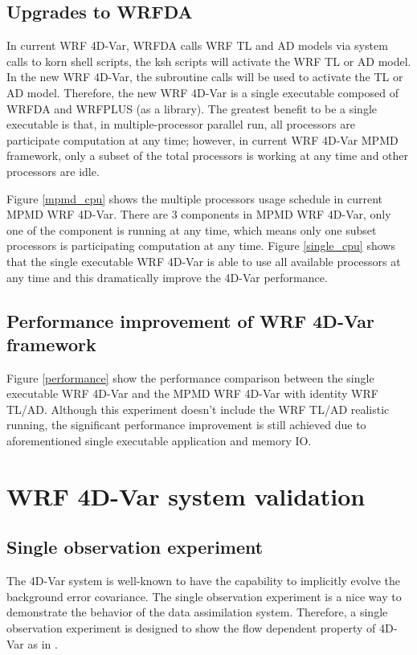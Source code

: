 \documentclass[12pt]{article}
\begin{document}
\subsection{Upgrades to WRFDA}

In current WRF 4D-Var, WRFDA calls WRF TL and AD models via system calls to korn shell scripts, the ksh scripts will activate the WRF TL or AD model. In the new WRF 4D-Var, the subroutine calls will be used to activate the TL or AD model. Therefore, the new WRF 4D-Var is a single executable composed of WRFDA and WRFPLUS (as a library). The greatest benefit to be a single executable is that, in multiple-processor parallel run, all processors are participate computation at any time; however, in current WRF 4D-Var MPMD framework, only a subset of the total processors is working at any time and other processors are idle.

Figure \ref{mpmd_cpu} shows the multiple processors usage schedule in current MPMD WRF 4D-Var. There are 3 components in MPMD WRF 4D-Var, only one of the component is running at any time, which means only one subset processors is participating computation at any time. Figure \ref{single_cpu} shows that the single executable WRF 4D-Var is able to use all available processors at any time and this dramatically improve the 4D-Var performance. 

\subsection{Performance improvement of WRF 4D-Var framework}

Figure \ref{performance} show the performance comparison between the single executable WRF 4D-Var and the MPMD WRF 4D-Var with identity WRF TL/AD.  Although this experiment doesn't include the WRF TL/AD realistic running, the significant performance improvement is still achieved due to aforementioned single executable application and memory IO.

\section{WRF 4D-Var system validation}

\subsection{Single observation experiment}

The 4D-Var system is well-known to have the capability to implicitly evolve the background error covariance. The single observation experiment is a nice way to demonstrate the behavior of the data assimilation system. Therefore, a single observation experiment is designed to show the flow dependent property of 4D-Var as in \cite{Huang2009}. 
\end{document}
